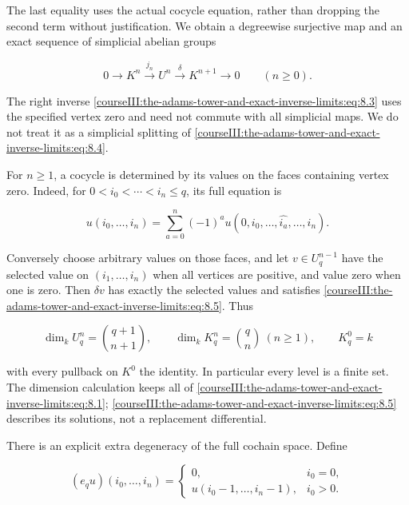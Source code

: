 The last equality uses the actual cocycle equation, rather than dropping the second term without justification. We obtain a degreewise surjective map and an exact sequence of simplicial abelian groups

\begin{equation}
0\longrightarrow K^n\xrightarrow{j_n}U^n
      \xrightarrow{\delta}K^{n+1}\longrightarrow0
       \qquad(n\geq0).
 \label{courseIII:the-adams-tower-and-exact-inverse-limits:eq:8.4}
\end{equation}

The right inverse \eqref{courseIII:the-adams-tower-and-exact-inverse-limits:eq:8.3} uses the specified vertex zero and need not commute with all simplicial maps. We do not treat it as a simplicial splitting of \eqref{courseIII:the-adams-tower-and-exact-inverse-limits:eq:8.4}.

For \(n\geq1\), a cocycle is determined by its values on the faces containing vertex zero. Indeed, for \(0<i_0<\cdots<i_n\leq q\), its full equation is

\begin{equation}
u(i_0,\ldots,i_n)
   =\sum_{a=0}^{n}(-1)^a
       u(0,i_0,\ldots,\widehat{i_a},\ldots,i_n).
 \label{courseIII:the-adams-tower-and-exact-inverse-limits:eq:8.5}
\end{equation}

Conversely choose arbitrary values on those faces, and let \(v\in U^{n-1}_q\) have the selected value on \((i_1,\ldots,i_n)\) when all vertices are positive, and value zero when one is zero. Then \(\delta v\) has exactly the selected values and satisfies \eqref{courseIII:the-adams-tower-and-exact-inverse-limits:eq:8.5}. Thus

\begin{equation}
\dim_k U^n_q=\binom{q+1}{n+1},\qquad
 \dim_k K^n_q=\binom qn\ (n\geq1),\qquad
 K^0_q=k
 \label{courseIII:the-adams-tower-and-exact-inverse-limits:eq:8.6}
\end{equation}

with every pullback on \(K^0\) the identity. In particular every level is a finite set. The dimension calculation keeps all of \eqref{courseIII:the-adams-tower-and-exact-inverse-limits:eq:8.1}; \eqref{courseIII:the-adams-tower-and-exact-inverse-limits:eq:8.5} describes its solutions, not a replacement differential.

There is an explicit extra degeneracy of the full cochain space. Define

\begin{equation}
(e_q u)(i_0,\ldots,i_n)=
 \begin{cases}
 0,&i_0=0,\\
 u(i_0-1,\ldots,i_n-1),&i_0>0.
 \end{cases}
 \label{courseIII:the-adams-tower-and-exact-inverse-limits:eq:8.7}
\end{equation}

